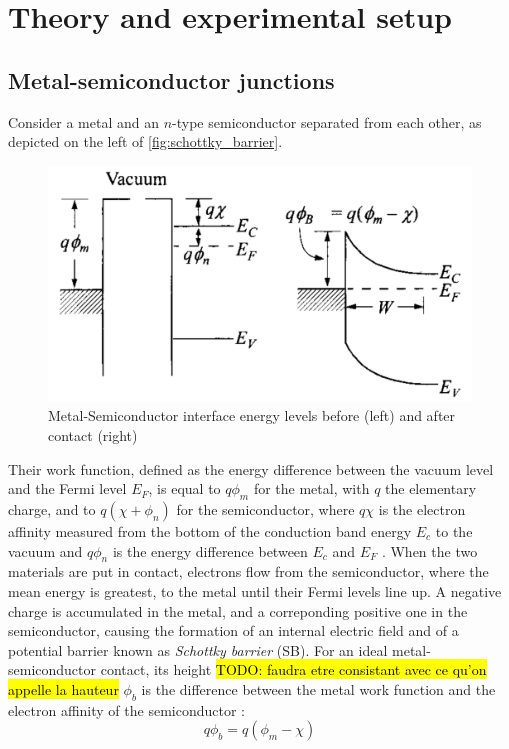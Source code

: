 \section{Theory and experimental setup}
\subsection{Metal-semiconductor junctions}
Consider a metal and an $n$-type semiconductor separated from each other, as depicted on the left of \autoref{fig:schottky_barrier}.
\begin{figure}[htbp]
    \centering
    \includegraphics[width=12cm]{figures/schottky_barrier.png}
    \caption{Metal-Semiconductor interface energy levels before (left) and after contact (right) \cite{}}
    \label{fig:schottky_barrier}
\end{figure}
Their work function, defined as the energy difference between the vacuum level and the Fermi level $E_F$, is equal to $q \phi_m$ for the metal, with $q$ the elementary charge, and to $q (\chi + \phi_n)$ for the semiconductor, where $q \chi$ is the electron affinity measured from the bottom of the conduction band energy $E_c$ to the vacuum and $q\phi_n$ is the energy difference between $E_c$ and $E_F$ \cite{sze_physics_2007}.
When the two materials are put in contact, electrons flow from the semiconductor, where the mean energy is greatest, to the metal until their Fermi levels line up.
A negative charge is accumulated in the metal, and a correponding positive one in the semiconductor, causing the formation of an internal electric field and of a potential barrier known as \emph{Schottky barrier} (SB).
For an ideal metal-semiconductor contact, its height \hl{TODO: faudra etre consistant avec ce qu'on appelle la hauteur} $\phi_b$ is the difference between the metal work function and the electron affinity of the semiconductor \cite{sze_physics_2007}:
\begin{equation} \label{eq:barrier_height}
    q\phi_b = q(\phi_m - \chi)
\end{equation}

